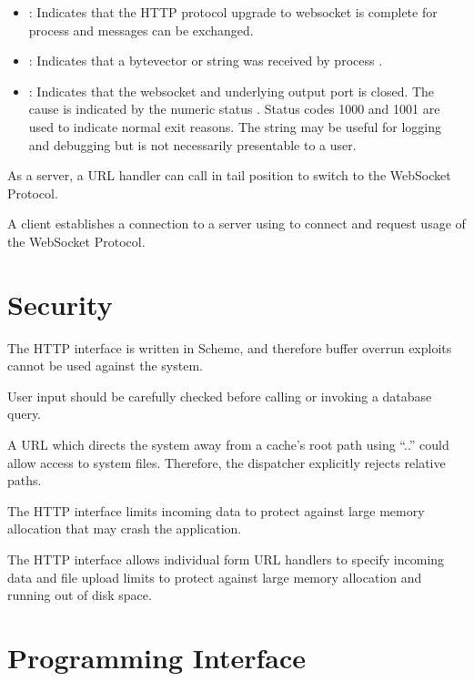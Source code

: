 \antipar\begin{itemize}

\item {}: Indicates that the HTTP protocol
  upgrade to websocket is complete for process  and messages
  can be exchanged.

\item {}: Indicates that a
   bytevector or string was received by process .

\item {}: Indicates
  that the websocket and underlying output port is closed. The cause
  is indicated by the numeric status . Status codes 1000 and
  1001 are used to indicate normal exit reasons.  The 
  string may be useful for logging and debugging but is not
  necessarily presentable to a user.

\end{itemize}

As a server, a URL handler can call  in tail position
to switch to the WebSocket Protocol.

A client establishes a connection to a server using 
to connect and request usage of the WebSocket Protocol.

\section {Security}

The HTTP interface is written in Scheme, and therefore buffer overrun
exploits cannot be used against the system.

User input should be carefully checked before calling  or
invoking a database query.

A URL which directs the system away from a cache's root path using
``..'' could allow access to system files. Therefore, the dispatcher
explicitly rejects relative paths.

The HTTP interface limits incoming data to protect against large
memory allocation that may crash the application.

The HTTP interface allows individual form URL handlers to specify
incoming data and file upload limits to protect against large memory
allocation and running out of disk space.

\section {Programming Interface}

